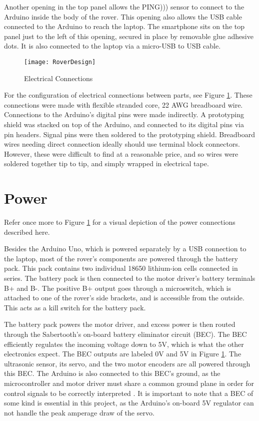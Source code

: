 Another opening in the top panel allows the PING))) sensor to connect to the Arduino inside the body of the rover. This opening also allows the USB cable connected to the Arduino to reach the laptop. The smartphone sits on the top panel just to the left of this opening, secured in place by removable glue adhesive dots. It is also connected to the laptop via a micro-USB to USB cable.

\begin{figure}[p] 
	\caption{Electrical Connections}
	\texttt{[image: RoverDesign]}
	\centering
	\label{figRoverDesign}
\end{figure}

For the configuration of electrical connections between parts, see Figure \ref{figRoverDesign}. These connections were made with flexible stranded core, 22 AWG breadboard wire. Connections to the Arduino's digital pins were made indirectly. A prototyping shield was stacked on top of the Arduino, and connected to its digital pins via pin headers. Signal pins were then soldered to the prototyping shield. Breadboard wires needing direct connection ideally should use terminal block connectors. However, these were difficult to find at a reasonable price, and so wires were soldered together tip to tip, and simply wrapped in electrical tape.

\section{Power}
Refer once more to Figure \ref{figRoverDesign} for a visual depiction of the power connections described here.

Besides the Arduino Uno, which is powered separately by a USB connection to the laptop, most of the rover's components are powered through the battery pack. This pack contains two individual 18650 lithium-ion cells connected in series. The battery pack is then connected to the motor driver's battery terminals B+ and B-. The positive B+ output goes through a microswitch, which is attached to one of the rover's side brackets, and is accessible from the outside. This acts as a kill switch for the battery pack.

The battery pack powers the motor driver, and excess power is then routed through the Sabertooth's on-board battery eliminator circuit (BEC). The BEC efficiently regulates the incoming voltage down to 5V, which is what the other electronics expect. The BEC outputs are labeled 0V and 5V in Figure \ref{figRoverDesign}. The ultrasonic sensor, its servo, and the two motor encoders are all powered through this BEC. The Arduino is also connected to this BEC's ground, as the microcontroller and motor driver must share a common ground plane in order for control signals to be correctly interpreted \cite{sabertoothUserGuide}. It is important to note that a BEC of some kind is essential in this project, as the Arduino's on-board 5V regulator can not handle the peak amperage draw of the servo.

